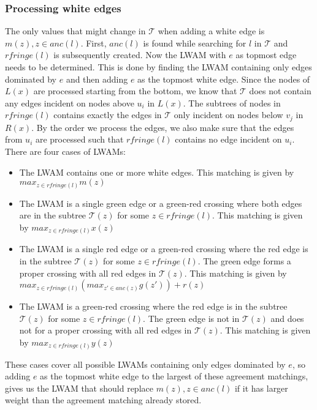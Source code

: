 \subsubsection{Processing white edges}
The only values that might change in $\mathcal{T}$ when adding a white edge is $m(z), z \in anc(l)$. First, $anc(l)$ is found while searching for $l$ in $\mathcal{T}$ and $rfringe(l)$ is subsequently created. Now the LWAM with $e$ as topmost edge needs to be determined. This is done by finding the LWAM containing only edges dominated by $e$ and then adding $e$ as the topmost white edge. Since the nodes of $L(x)$ are processed starting from the bottom, we know that $\mathcal{T}$ does not contain any edges incident on nodes above $u_i$ in $L(x)$. The subtrees of nodes in $rfringe(l)$ contains exactly the edges in $\mathcal{T}$ only incident on nodes below $v_j$ in $R(x)$. By the order we process the edges, we also make sure that the edges from $u_i$ are processed such that $rfringe(l)$ contains no edge incident on $u_i$. There are four cases of LWAMs:
\begin{itemize}
	\item The LWAM contains one or more white edges.
	\subitem This matching is given by $max_{z \in rfringe(l)} m(z)$
	\item The LWAM is a single green edge or a green-red crossing where both edges are in the subtree $\mathcal{T}(z)$ for some $z \in rfringe(l)$.
	\subitem This matching is given by $max_{z \in rfringe(l)} x(z)$
	\item The LWAM is a single red edge or a green-red crossing where the red edge is in the subtree $\mathcal{T}(z)$ for some $z \in rfringe(l)$. The green edge forms a proper crossing with all red edges in $\mathcal{T}(z)$.
	\subitem This matching is given by $max_{z \in rfringe(l)} (max_{z' \in anc(z)} g(z')) + r(z)$
	\item The LWAM is a green-red crossing where the red edge is in the subtree $\mathcal{T}(z)$ for some $z \in rfringe(l)$. The green edge is not in $\mathcal{T}(z)$ and does not for a proper crossing with all red edges in $\mathcal{T}(z)$.
	This matching is given by $max_{z \in rfringe(l)} y(z)$
\end{itemize}

These cases cover all possible LWAMs containing only edges dominated by $e$, so adding $e$ as the topmost white edge to the largest of these agreement matchings, gives us the LWAM that should replace $m(z), z \in anc(l)$ if it has larger weight than the agreement matching already stored.

